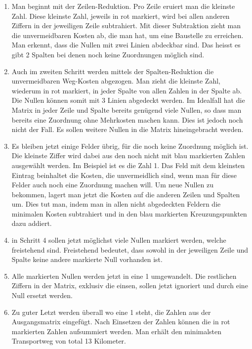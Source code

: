 \begin{enumerate}
\item Man beginnt mit der Zeilen-Reduktion. Pro Zeile eruiert man die kleinste Zahl. Diese kleinste Zahl, jeweils in rot markiert, wird bei allen anderen Ziffern in der jeweiligen Zeile subtrahiert. Mit dieser Subtraktion zieht man die unvermeidbaren Kosten ab, die man hat, um eine Baustelle zu erreichen. Man erkennt, dass die Nullen mit zwei Linien abdeckbar sind. Das heisst es gibt 2 Spalten bei denen noch keine Zuordnungen möglich sind. 

\item Auch im zweiten Schritt werden mittels der Spalten-Reduktion die unvermeidbaren Weg-Kosten abgezogen. Man zieht die kleinste Zahl, wiederum in rot markiert, in jeder Spalte von allen Zahlen in der Spalte ab.
Die Nullen können somit mit 3 Linien abgedeckt werden. Im Idealfall hat die Matrix in jeder Zeile und Spalte bereits genügend viele Nullen, so dass man bereits eine Zuordnung ohne Mehrkosten machen kann. Dies ist jedoch noch nicht der Fall. Es sollen weitere Nullen in die Matrix hineingebracht werden.

\item Es bleiben jetzt einige Felder übrig, für die noch keine Zuordnung möglich ist. Die kleinste Ziffer wird dabei aus den noch nicht mit blau markierten Zahlen ausgewählt werden. Im Beispiel ist es die Zahl 1. Das Feld mit dem kleinsten Eintrag beinhaltet die Kosten, die unvermeidlich sind, wenn man für diese Felder auch noch eine Zuordnung machen will. Um neue Nullen zu bekommen, lagert man jetzt die Kosten auf die anderen Zeilen und Spalten um. Dies tut man, indem man in allen nicht abgedeckten Feldern die minimalen Kosten subtrahiert und in den blau markierten Kreuzungspunkten dazu addiert.

\item in Schritt 4 sollen jetzt möglichst viele Nullen markiert werden, welche freistehend sind.
Freistehend bedeutet, dass sowohl in der jeweiligen Zeile und Spalte keine andere markierte Null vorhanden ist.

\item Alle markierten Nullen werden jetzt in eine 1 umgewandelt. Die restlichen Ziffern in der Matrix, exklusiv die einsen, sollen jetzt ignoriert und durch eine Null ersetzt werden.

\item Zu guter Letzt werden überall wo eine 1 steht, die Zahlen aus der Ausgangsmatrix eingefügt. Nach Einsetzen der Zahlen können die in rot markierten Zahlen aufsummiert werden. Man erhält den minimalsten Transportweg von total 13 Kilometer.
\end{enumerate}

